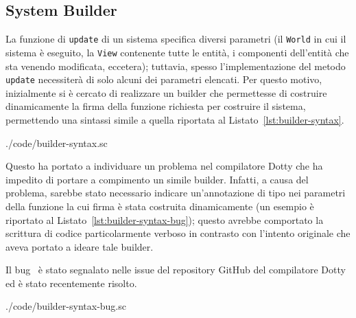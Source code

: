 \subsection{System Builder}\label{subsec:system-builder}
La funzione di \texttt{update} di un sistema specifica diversi parametri (il \texttt{World} in cui il sistema è
eseguito, la \texttt{View} contenente tutte le entità, i componenti dell'entità che sta venendo modificata, eccetera);
tuttavia, spesso l'implementazione del metodo \texttt{update} necessiterà di solo alcuni dei parametri elencati.
Per questo motivo, inizialmente si è cercato di realizzare un builder che permettesse di costruire dinamicamente la
firma della funzione richiesta per costruire il sistema, permettendo una sintassi simile a quella riportata al
Listato~\ref{lst:builder-syntax}.


{./code/builder-syntax.sc}

Questo ha portato a individuare un problema nel compilatore Dotty che ha impedito di portare a compimento un simile
builder.
Infatti, a causa del problema, sarebbe stato necessario indicare un'annotazione di tipo nei parametri della
funzione la cui firma è stata costruita dinamicamente (un esempio è riportato al Listato~\ref{lst:builder-syntax-bug});
questo avrebbe comportato la scrittura di codice particolarmente verboso in contrasto con l'intento originale che aveva
portato a ideare tale builder.

Il bug~\cite{dotty-bug} è stato segnalato nelle issue del repository GitHub del compilatore Dotty
ed è stato recentemente risolto.


{./code/builder-syntax-bug.sc}
